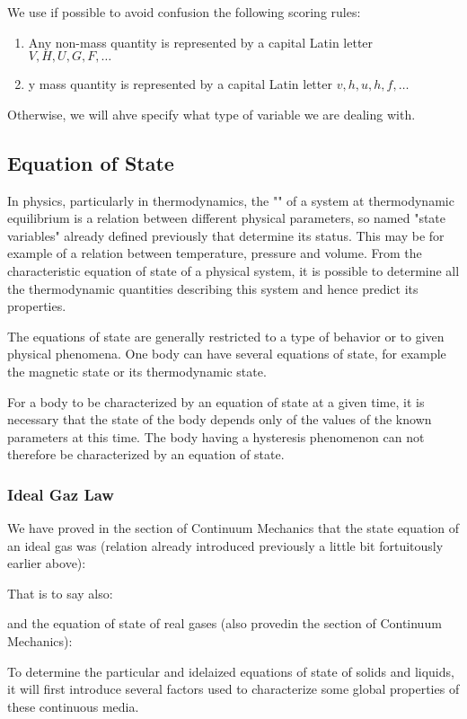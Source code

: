 	We use if possible to avoid confusion the following scoring rules:
	\begin{enumerate}
		\item Any non-mass quantity is represented by a capital Latin letter $ V, H, U, G, F,\ldots$
		\item y mass quantity is represented by a capital Latin letter $v, h, u, h, f,\ldots$
	\end{enumerate}
	Otherwise, we will ahve specify what type of variable we are dealing with.
	
	\subsection{Equation of State}
	In physics, particularly in thermodynamics, the "" of a system at thermodynamic equilibrium is a relation between different physical parameters, so named "state variables" already defined previously that determine its status. This may be for example of a relation between temperature, pressure and volume. From the characteristic equation of state of a physical system, it is possible to determine all the thermodynamic quantities describing this system and hence predict its properties.

	The equations of state are generally restricted to a type of behavior or to given physical phenomena. One body can have several equations of state, for example the magnetic state or its thermodynamic state.
	
	For a body to be characterized by an equation of state at a given time, it is necessary that the state of the body depends only of the values of the known parameters at this time. The body having a hysteresis phenomenon can not therefore be characterized by an equation of state.
	
	\subsubsection{Ideal Gaz Law}
	We have proved in the section of Continuum Mechanics that the state equation of an ideal gas was (relation already introduced previously a little bit fortuitously earlier above):
		
	That is to say also:
	
	and the equation of state of real gases (also provedin the section of Continuum Mechanics):
	
	To determine the particular and idelaized equations of state of solids and liquids, it will first introduce several factors used to characterize some global properties of these continuous media.

